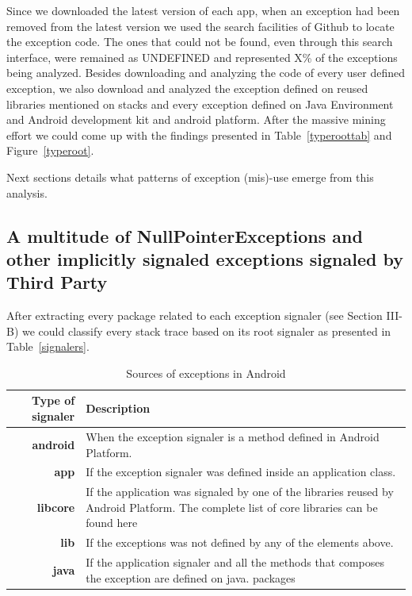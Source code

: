 \documentclass[conference]{IEEEtran}
\begin{document}
Since we downloaded the latest version of each app, when an exception had been removed from the latest version we used the search facilities of Github to locate the exception code. The ones that could not be found, even through this search interface, were remained as UNDEFINED and represented X\% of the exceptions being analyzed. Besides downloading and analyzing the code of every user defined exception, we also download and analyzed the exception defined on reused libraries mentioned on stacks and every exception defined on Java Environment and Android development kit and android platform. After the massive mining effort we could come up with the findings presented in Table~\ref{typeroottab} and Figure~\ref{typeroot}.

Next sections details what patterns of exception (mis)-use emerge from this analysis.

\subsection{A multitude of NullPointerExceptions and other implicitly signaled exceptions signaled by Third Party}

After extracting every package related to each exception signaler (see Section III-B) we could classify every stack trace based on its root signaler as presented in Table~\ref{signalers}.

\begin{table}
  \centering
  \begin{tabular}{rp{22em}}
    \hline
    \bfseries{Type of signaler} & \bfseries{Description} \\
    \hline
    \bfseries{android} &	When the exception signaler is a method defined in Android Platform.\\
    \bfseries{app} &	If the exception signaler was defined inside an application class.\\
    \bfseries{libcore} &	If the application was signaled by one of the libraries reused by Android Platform. The complete list of core libraries can be found here\\
    \bfseries{lib} &	If the exceptions was not defined by any of the elements above.\\
    \bfseries{java} &	If the application signaler and all the methods that composes the exception are defined on java. packages\\
    \hline
  \end{tabular}
  \caption{Sources of exceptions in Android}
  \label{tab:signalers}
\end{table}
\end{document}
